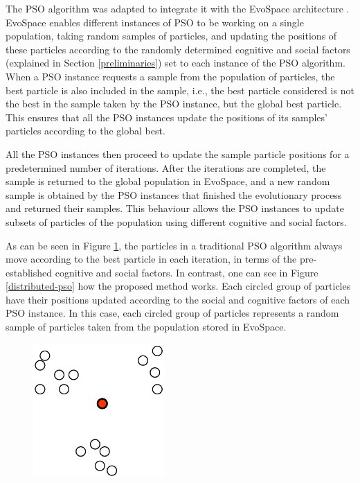 \documentclass[runningheads,a4paper]{llncs}
\begin{document}
The PSO algorithm was adapted to integrate it with the EvoSpace
architecture \cite{garcia2015evospace}. EvoSpace enables different
instances of PSO to be working on a single population, taking random
samples of particles, and updating the positions of these particles
according to the randomly determined cognitive and social factors
(explained in Section \ref{preliminaries}) set to each instance of the
PSO algorithm. When a PSO instance requests a sample from the
population of particles, the best particle is also included in
the sample, i.e., the best particle considered is not the best in the
sample taken by the PSO instance, but the global best particle. This
ensures that all the PSO instances update the positions of its
samples' particles according to the global best.

All the PSO instances then proceed to update the sample particle
positions for a predetermined number of iterations. After the
iterations are completed, the sample is returned to the global
population in EvoSpace, and a new random sample is obtained by the PSO
instances that finished the evolutionary process and returned their
samples. This behaviour allows the PSO instances to update subsets of
particles of the population using different cognitive and social
factors.

As can be seen in Figure \ref{traditional-pso}, the particles in a
traditional PSO algorithm always move according to the best particle
in each iteration, in terms of the pre-established cognitive and
social factors. In contrast, one can see in Figure
\ref{distributed-pso} how the proposed method works. Each circled
group of particles have their positions updated according to the
social and cognitive factors of each PSO instance. In this case, each
circled group of particles represents a random sample of particles
taken from the population stored in EvoSpace.

\begin{figure}
  \centering
  \includegraphics[width=5cm]{pdf/traditional-pso}
  \caption{}
  \label{traditional-pso}
\end{figure}
\end{document}
